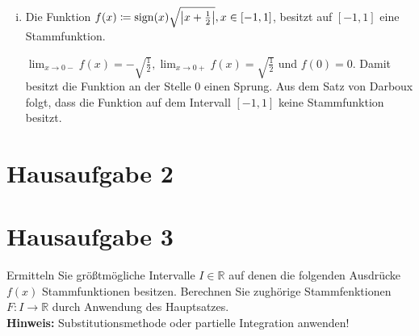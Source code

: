 \documentclass{article}
\begin{document}
\begin{enumerate}[(i)]
\newpage
\item Die Funktion $f(x) \coloneqq \text{sign}(x) \sqrt{\abs{x + \frac{1}{2}}}, x \in [-1,1]$, besitzt
  auf $[-1,1]$ eine Stammfunktion.

  \label{dia:1.2}

  $\lim_{x \to 0-} f(x) = - \sqrt{\frac{1}{2}}, \lim_{x \to 0+} f(x) = \sqrt{\frac{1}{2}}$ und $f(0) = 0$.
  Damit besitzt die Funktion an der Stelle $0$ einen Sprung.
  Aus dem Satz von Darboux folgt, dass die Funktion auf dem Intervall $[-1, 1]$ keine Stammfunktion besitzt.
\end{enumerate}

\section*{Hausaufgabe 2}

\newpage
\section*{Hausaufgabe 3}

Ermitteln Sie größtmögliche Intervalle $I \in \mathbb{R}$ auf denen
die folgenden Ausdrücke $f(x)$ Stammfunktionen besitzen.
Berechnen Sie zughörige Stammfenktionen $F: I \to \mathbb{R}$ durch
Anwendung des Hauptsatzes. \\
\textbf{Hinweis:} Substitutionsmethode oder partielle Integration anwenden!
\end{document}
